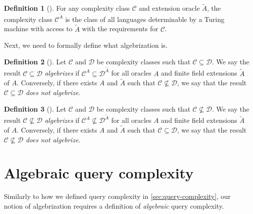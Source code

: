 \documentclass[english]{reedthesis}
\theoremstyle{plain}
\theoremstyle{definition}
\newtheorem{defn}[defn]{Definition}
\theoremstyle{remark}
\begin{document}

\begin{defn}[{\cite[Def.\ 2.2]{AW09}}]\label{def:ext-oracle-class}
  For any complexity class $\mathcal{C}$ and extension oracle $\tilde{A}$, the complexity
  class $\mathcal{C}^{\tilde{A}}$ is the class of all languages determinable by a Turing
  machine with access to $\tilde{A}$ with the requirements for $\mathcal{C}$.
\end{defn}

Next, we need to formally define what algebrization is.

\begin{defn}[{\cite[Def.\ 2.3]{AW09}}]\label{def:algebrization}
  Let $\mathcal{C}$ and $\mathcal{D}$ be complexity classes such that $\mathcal{C} \subseteq \mathcal{D}$. We say the result
  $\mathcal{C} \subseteq \mathcal{D}$ \emph{algebrizes} if $\mathcal{C}^{A} \subseteq \mathcal{D}^{\tilde{A}}$ for all oracles $A$ and
  finite field extensions $\tilde{A}$ of $A$. Conversely, if there exists $A$
  and $\tilde{A}$ such that $\mathcal{C} \nsubseteq \mathcal{D}$, we say that the result $\mathcal{C} \subseteq \mathcal{D}$ \emph{does
    not algebrize}.
\end{defn}

\begin{defn}[{\cite[Def.\ 2.3]{AW09}}]\label{def:algebrization-neq}
  Let $\mathcal{C}$ and $\mathcal{D}$ be complexity classes such that $\mathcal{C} \nsubseteq \mathcal{D}$. We say the result
  $\mathcal{C} \nsubseteq \mathcal{D}$ \emph{algebrizes} if $\mathcal{C}^{A} \nsubseteq \mathcal{D}^{\tilde{A}}$ for all oracles $A$ and
  finite field extensions $\tilde{A}$ of $A$. Conversely, if there exists $A$
  and $\tilde{A}$ such that $\mathcal{C} \subseteq \mathcal{D}$, we say that the result $\mathcal{C} \nsubseteq \mathcal{D}$ \emph{does
    not algebrize}.
\end{defn}

\section{Algebraic query complexity}\label{sec:alg-query-complexity}

Similarly to how we defined query complexity in \cref{sec:query-complexity}, our
notion of algebrization requires a definition of \emph{algebraic} query
complexity. %
\end{document}
